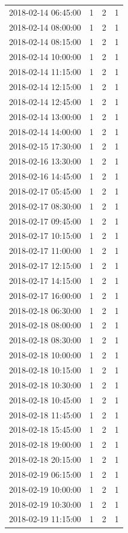 \begin{tabular}{lrrr}
2018-02-14 06:45:00 & 1 & 2 & 1 \\
2018-02-14 08:00:00 & 1 & 2 & 1 \\
2018-02-14 08:15:00 & 1 & 2 & 1 \\
2018-02-14 10:00:00 & 1 & 2 & 1 \\
2018-02-14 11:15:00 & 1 & 2 & 1 \\
2018-02-14 12:15:00 & 1 & 2 & 1 \\
2018-02-14 12:45:00 & 1 & 2 & 1 \\
2018-02-14 13:00:00 & 1 & 2 & 1 \\
2018-02-14 14:00:00 & 1 & 2 & 1 \\
2018-02-15 17:30:00 & 1 & 2 & 1 \\
2018-02-16 13:30:00 & 1 & 2 & 1 \\
2018-02-16 14:45:00 & 1 & 2 & 1 \\
2018-02-17 05:45:00 & 1 & 2 & 1 \\
2018-02-17 08:30:00 & 1 & 2 & 1 \\
2018-02-17 09:45:00 & 1 & 2 & 1 \\
2018-02-17 10:15:00 & 1 & 2 & 1 \\
2018-02-17 11:00:00 & 1 & 2 & 1 \\
2018-02-17 12:15:00 & 1 & 2 & 1 \\
2018-02-17 14:15:00 & 1 & 2 & 1 \\
2018-02-17 16:00:00 & 1 & 2 & 1 \\
2018-02-18 06:30:00 & 1 & 2 & 1 \\
2018-02-18 08:00:00 & 1 & 2 & 1 \\
2018-02-18 08:30:00 & 1 & 2 & 1 \\
2018-02-18 10:00:00 & 1 & 2 & 1 \\
2018-02-18 10:15:00 & 1 & 2 & 1 \\
2018-02-18 10:30:00 & 1 & 2 & 1 \\
2018-02-18 10:45:00 & 1 & 2 & 1 \\
2018-02-18 11:45:00 & 1 & 2 & 1 \\
2018-02-18 15:45:00 & 1 & 2 & 1 \\
2018-02-18 19:00:00 & 1 & 2 & 1 \\
2018-02-18 20:15:00 & 1 & 2 & 1 \\
2018-02-19 06:15:00 & 1 & 2 & 1 \\
2018-02-19 10:00:00 & 1 & 2 & 1 \\
2018-02-19 10:30:00 & 1 & 2 & 1 \\
2018-02-19 11:15:00 & 1 & 2 & 1 \\

\end{tabular}
